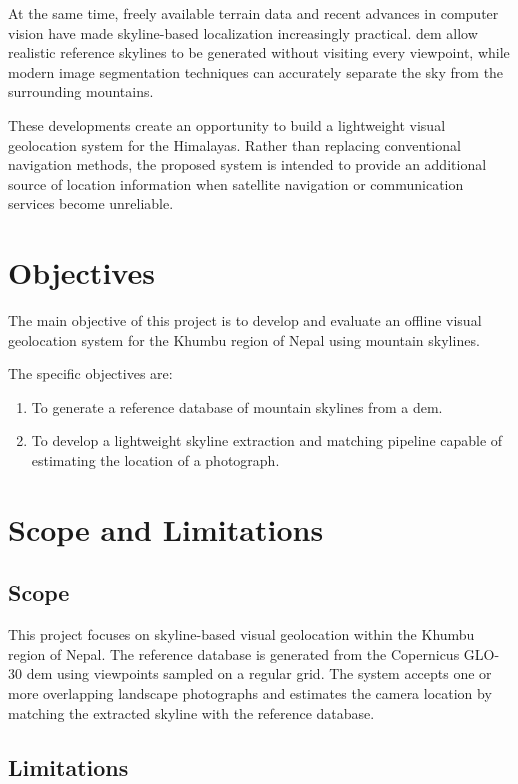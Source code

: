 At the same time, freely available terrain data and recent advances in computer vision have made skyline-based localization increasingly practical. \Gls{dem} allow realistic reference skylines to be generated without visiting every viewpoint, while modern image segmentation techniques can accurately separate the sky from the surrounding mountains.

These developments create an opportunity to build a lightweight visual geolocation system for the Himalayas. Rather than replacing conventional navigation methods, the proposed system is intended to provide an additional source of location information when satellite navigation or communication services become unreliable.

\section{Objectives}

The main objective of this project is to develop and evaluate an offline visual geolocation system for the Khumbu region of Nepal using mountain skylines.

The specific objectives are:

\begin{enumerate}
    \item To generate a reference database of mountain skylines from a \Gls{dem}.
    \item To develop a lightweight skyline extraction and matching pipeline capable of estimating the location of a photograph.
\end{enumerate}

\section{Scope and Limitations}

\subsection{Scope}

This project focuses on skyline-based visual geolocation within the Khumbu region of Nepal. The reference database is generated from the Copernicus GLO-30 \Gls{dem} using viewpoints sampled on a regular grid. The system accepts one or more overlapping landscape photographs and estimates the camera location by matching the extracted skyline with the reference database.

\subsection{Limitations}

